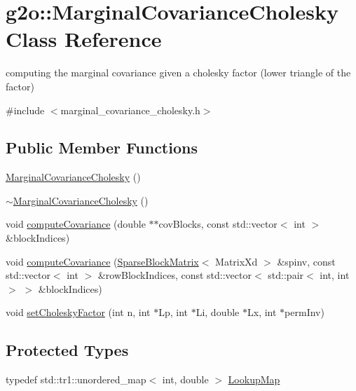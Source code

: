 \hypertarget{classg2o_1_1_marginal_covariance_cholesky}{}\section{g2o\+:\+:Marginal\+Covariance\+Cholesky Class Reference}
\label{classg2o_1_1_marginal_covariance_cholesky}


computing the marginal covariance given a cholesky factor (lower triangle of the factor)  




{\ttfamily \#include $<$marginal\+\_\+covariance\+\_\+cholesky.\+h$>$}

\subsection*{Public Member Functions}
\begin{DoxyCompactItemize}
\item 
\mbox{\hyperlink{classg2o_1_1_marginal_covariance_cholesky_a1fab5946726badbb38c2b2aa54a0118c}{Marginal\+Covariance\+Cholesky}} ()
\item 
\mbox{\hyperlink{classg2o_1_1_marginal_covariance_cholesky_aafdc3a753d5b6f3fca95d5bcbca44442}{$\sim$\+Marginal\+Covariance\+Cholesky}} ()
\item 
void \mbox{\hyperlink{classg2o_1_1_marginal_covariance_cholesky_a0ea50dbda0558ca98faacafc8c9f48c9}{compute\+Covariance}} (double $\ast$$\ast$cov\+Blocks, const std\+::vector$<$ int $>$ \&block\+Indices)
\item 
void \mbox{\hyperlink{classg2o_1_1_marginal_covariance_cholesky_a77e7396fb18b334b4d707f41e5e05399}{compute\+Covariance}} (\mbox{\hyperlink{classg2o_1_1_sparse_block_matrix}{Sparse\+Block\+Matrix}}$<$ Matrix\+Xd $>$ \&spinv, const std\+::vector$<$ int $>$ \&row\+Block\+Indices, const std\+::vector$<$ std\+::pair$<$ int, int $>$ $>$ \&block\+Indices)
\item 
void \mbox{\hyperlink{classg2o_1_1_marginal_covariance_cholesky_a53bda8bc29bee2a7fb871c25a58ab191}{set\+Cholesky\+Factor}} (int n, int $\ast$Lp, int $\ast$Li, double $\ast$Lx, int $\ast$perm\+Inv)
\end{DoxyCompactItemize}
\subsection*{Protected Types}
\begin{DoxyCompactItemize}
\item 
typedef std\+::tr1\+::unordered\+\_\+map$<$ int, double $>$ \mbox{\hyperlink{classg2o_1_1_marginal_covariance_cholesky_a9925dd2e45479a7feb783ff71d93fdbc}{Lookup\+Map}}
\end{DoxyCompactItemize}
